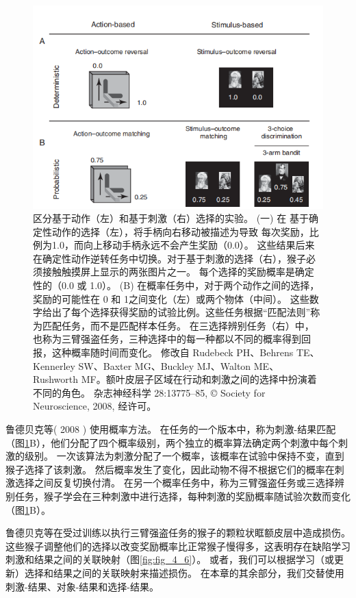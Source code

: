 \begin{figure}[!htb]
	\centering
	\includegraphics{image_pfc/Fig_4_5}
	\caption{区分基于动作（左）和基于刺激（右）选择的实验。 (一) 在
		基于确定性动作的选择（左），将手柄向右移动被描述为导致
		每次奖励，比例为1.0，而向上移动手柄永远不会产生奖励（0.0）。 这些结果后来在确定性动作逆转任务中切换。对于基于刺激的选择（右），猴子必须接触触摸屏上显示的两张图片之一。 每个选择的奖励概率是确定性的（0.0 或 1.0）。 (B) 在概率任务中，对于两个动作之间的选择，奖励的可能性在 0 和 1之间变化（左）或两个物体（中间）。 这些数字给出了每个选择获得奖励的试验比例。这些任务根据“匹配法则”称为匹配任务，而不是匹配样本任务。 在三选择辨别任务（右）中，也称为三臂强盗任务，三种选择中的每一种都以不同的概率得到回报，这种概率随时间而变化。 修改自	Rudebeck PH、Behrens TE、Kennerley SW、Baxter MG、Buckley MJ、Walton ME、Rushworth MF。额叶皮层子区域在行动和刺激之间的选择中扮演着不同的角色。 杂志神经科学 28:13775–85, © Society for Neuroscience, 2008, 经许可。}
	\label{fig:fig_4_5}
\end{figure}


鲁德贝克等( 2008 ) 使用概率方法。
在任务的一个版本中，称为刺激-结果匹配（图\ref{fig:fig_4_5}B），他们分配了四个概率级别，两个独立的概率算法确定两个刺激中每个刺激的级别。
一次该算法为刺激分配了一个概率，该概率在试验中保持不变，直到猴子选择了该刺激。
然后概率发生了变化，因此动物不得不根据它们的概率在刺激选择之间反复切换付清。
在另一个概率任务中，称为三臂强盗任务或三选择辨别任务，猴子学会在三种刺激中进行选择，每种刺激的奖励概率随试验次数而变化（图\ref{fig:fig_4_5}B）。\par


鲁德贝克等在受过训练以执行三臂强盗任务的猴子的颗粒状眶额皮层中造成损伤。
这些猴子调整他们的选择以改变奖励概率比正常猴子慢得多，这表明存在缺陷学习刺激和结果之间的关联映射（图\ref{fig:fig_4_6}）。
或者，我们可以根据学习（或更新）选择和结果之间的关联映射来描述损伤。
在本章的其余部分，我们交替使用刺激-结果、对象-结果和选择-结果。\par


